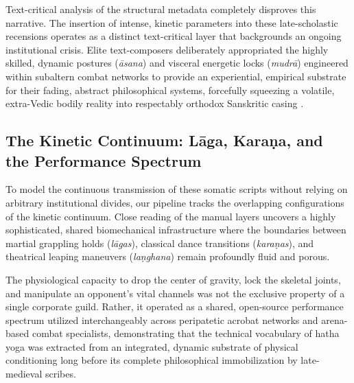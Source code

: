 \documentclass[11pt,twoside,letterpaper]{article}
\begin{document}
Text-critical analysis of the structural metadata completely disproves this narrative. The insertion of intense, kinetic parameters into these late-scholastic recensions operates as a distinct text-critical layer that backgrounds an ongoing institutional crisis. Elite text-composers deliberately appropriated the highly skilled, dynamic postures (\textit{\={a}sana}) and visceral energetic locks (\textit{mudr\={a}}) engineered within subaltern combat networks to provide an experiential, empirical substrate for their fading, abstract philosophical systems, forcefully squeezing a volatile, extra-Vedic bodily reality into respectably orthodox Sanskritic casing \citep{Bouy1994}.

\subsection{The Kinetic Continuum: L\={a}ga, Kara\d{n}a, and the Performance Spectrum}
To model the continuous transmission of these somatic scripts without relying on arbitrary institutional divides, our pipeline tracks the overlapping configurations of the kinetic continuum. Close reading of the manual layers uncovers a highly sophisticated, shared biomechanical infrastructure where the boundaries between martial grappling holds (\textit{l\={a}gas}), classical dance transitions (\textit{kara\d{n}as}), and theatrical leaping maneuvers (\textit{la\d{n}ghana}) remain profoundly fluid and porous. 

The physiological capacity to drop the center of gravity, lock the skeletal joints, and manipulate an opponent's vital channels was not the exclusive property of a single corporate guild. Rather, it operated as a shared, open-source performance spectrum utilized interchangeably across peripatetic acrobat networks and arena-based combat specialists, demonstrating that the technical vocabulary of hatha yoga was extracted from an integrated, dynamic substrate of physical conditioning long before its complete philosophical immobilization by late-medieval scribes.
\end{document}
